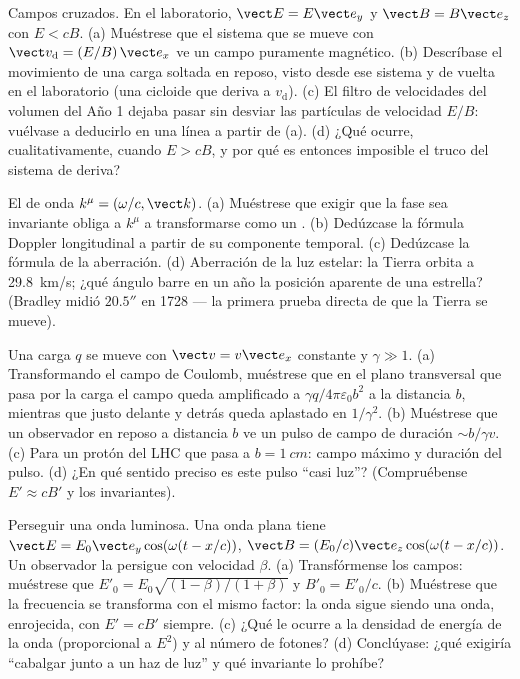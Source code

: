 \begin{exercise}[$\star\star$]\label{exo:b3:covariant-electromagnetism:7}
Campos cruzados. En el laboratorio, $\vect E = E\vect e_y$ y $\vect B =
B\vect e_z$ con $E < cB$. (a) Muéstrese que el sistema que se mueve con
$\vect v_{\text{d}} = (E/B)\,\vect e_x$ ve un campo puramente magnético.
(b) Descríbase el movimiento de una carga soltada en reposo, visto desde ese
sistema y de vuelta en el laboratorio (una cicloide que deriva a
$v_{\text{d}}$). (c) El filtro de velocidades del volumen del Año 1 dejaba
pasar sin desviar las partículas de velocidad $E/B$: vuélvase a deducirlo en
una línea a partir de (a). (d) ¿Qué ocurre, cualitativamente, cuando
$E > cB$, y por qué es entonces imposible el truco del sistema de deriva?
\end{exercise}

\begin{exercise}[$\star\star$]\label{exo:b3:covariant-electromagnetism:8}
El  de onda $k^\mu = (\omega/c, \vect k)$. (a) Muéstrese que
exigir que la fase sea invariante obliga a $k^\mu$ a transformarse como un
. (b) Dedúzcase la fórmula Doppler longitudinal a partir de su
componente temporal. (c) Dedúzcase la fórmula de la aberración. (d) Aberración
de la luz estelar: la Tierra orbita a \qty{29.8}{km/s}; ¿qué ángulo barre en
un año la posición aparente de una estrella? (Bradley midió
$20.5''$ en 1728 --- la primera prueba directa de que la Tierra se mueve).
\end{exercise}

\begin{exercise}[$\star\star$]\label{exo:b3:covariant-electromagnetism:9}
Una carga $q$ se mueve con $\vect v = v\vect e_x$ constante y $\gamma \gg
1$. (a) Transformando el campo de Coulomb, muéstrese que en el plano
transversal que pasa por la carga el campo queda amplificado a $\gamma
q/4\pi\varepsilon_0b^2$ a la distancia $b$, mientras que justo delante y
detrás queda aplastado en $1/\gamma^2$. (b) Muéstrese que un
observador en reposo a distancia $b$ ve un pulso de campo de duración
$\sim b/\gamma v$. (c) Para un protón del LHC que pasa a $b = \qty{1}{cm}$:
campo máximo y duración del pulso. (d) ¿En qué sentido preciso es este
pulso ``casi luz''? (Compruébense $E' \approx cB'$ y los invariantes).
\end{exercise}

\begin{exercise}[$\star\star\star$]\label{exo:b3:covariant-electromagnetism:10}
Perseguir una onda luminosa. Una onda plana tiene $\vect E = E_0\vect e_y
\cos(\omega(t - x/c))$, $\vect B = (E_0/c)\vect e_z\cos(\omega(t -
x/c))$. Un observador la persigue con velocidad $\beta$. (a) Transfórmense los
campos: muéstrese que $E'_0 = E_0\sqrt{(1-\beta)/(1+\beta)}$ y $B'_0 = E'_0/c$. (b)
Muéstrese que la frecuencia se transforma con el mismo factor: la onda sigue
siendo una onda, enrojecida, con $E' = cB'$ siempre. (c) ¿Qué le ocurre a la
densidad de energía de la onda (proporcional a $E^2$) y al número de
fotones? (d) Conclúyase: ¿qué exigiría ``cabalgar junto a un haz de luz'' y
qué invariante lo prohíbe?
\end{exercise}

